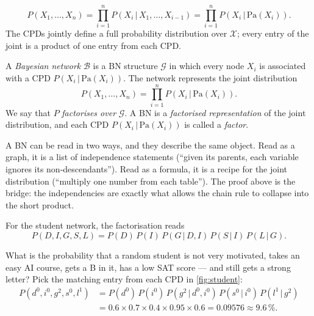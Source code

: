 \documentclass[11pt, oneside]{book}
\newcommand{\Prob}{\mathbb{P}}           %
\newcommand{\given}{\,\vert\,}           %
\newcommand{\Pa}{\mathrm{Pa}}            %
\newcommand{\Xall}{\mathcal{X}}          %
\begin{document}
\begin{thmbox}[title={Chain rule for Bayesian networks}, unbreakable]
\[
P(X_1, \ldots, X_n) = \prod_{i=1}^{n} P(X_i \given X_1, \ldots, X_{i-1})
                    = \prod_{i=1}^{n} P(X_i \given \Pa(X_i)).
\]
The CPDs jointly define a full probability distribution over $\Xall$; every
entry of the joint is a product of one entry from each CPD.
\end{thmbox}

\begin{defbox}[title={Bayesian network (part II of the definition)}]
A \emph{Bayesian network} $\mathcal{B}$ is a BN structure $\mathcal{G}$ in
which every node $X_i$ is associated with a CPD $P(X_i \given \Pa(X_i))$. The
network represents the joint distribution
\[
P(X_1, \ldots, X_n) = \prod_{i=1}^{n} P(X_i \given \Pa(X_i)).
\]
We say that $P$ \emph{factorises over} $\mathcal{G}$. A BN is a
\emph{factorised representation} of the joint distribution, and each CPD
$P(X_i \given \Pa(X_i))$ is called a \emph{factor}.
\end{defbox}

\begin{intbox}[unbreakable]
A BN can be read in two ways, and they describe the same object. Read as a
graph, it is a list of independence statements (``given its parents, each
variable ignores its non-descendants''). Read as a formula, it is a recipe for
the joint distribution (``multiply one number from each table''). The proof
above is the bridge: the independencies are exactly what allows the chain rule
to collapse into the short product.
\end{intbox}

For the student network, the factorisation reads
\[
P(D, I, G, S, L) = P(D)\, P(I)\, P(G \given D, I)\, P(S \given I)\, P(L \given G).
\]

\begin{exbox}[title={One entry of the joint}, unbreakable]
What is the probability that a random student is not very motivated, takes an
easy AI course, gets a B in it, has a low SAT score --- and still gets a
strong letter? Pick the matching entry from each CPD in \cref{fig:student}:
\begin{align*}
P(d^0, i^0, g^2, s^0, l^1)
&= P(d^0)\, P(i^0)\, P(g^2 \given d^0, i^0)\, P(s^0 \given i^0)\, P(l^1 \given g^2) \\
&= 0.6 \times 0.7 \times 0.4 \times 0.95 \times 0.6 = 0.09576 \approx 9.6\,\%.
\end{align*}
\end{exbox}
\end{document}
